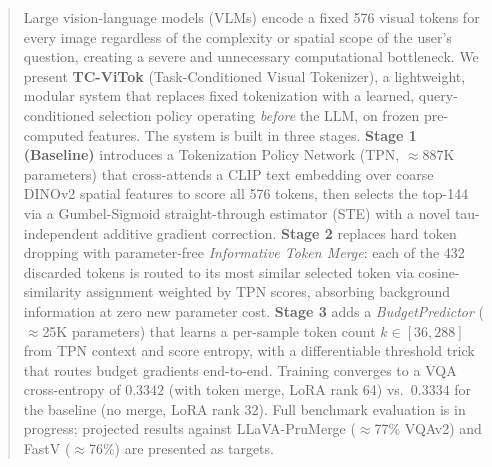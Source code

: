 \documentclass{article}
\begin{document}

\begin{abstract}
Large vision-language models (VLMs) encode a fixed 576 visual tokens for every image
regardless of the complexity or spatial scope of the user's question, creating a severe
and unnecessary computational bottleneck.
We present \textbf{TC-ViTok} (Task-Conditioned Visual Tokenizer), a lightweight,
modular system that replaces fixed tokenization with a learned, query-conditioned
selection policy operating \emph{before} the LLM, on frozen pre-computed features.
The system is built in three stages.
\textbf{Stage 1 (Baseline)} introduces a Tokenization Policy Network (TPN, $\approx$887K
parameters) that cross-attends a CLIP text embedding over coarse DINOv2 spatial features
to score all 576 tokens, then selects the top-144 via a Gumbel-Sigmoid
straight-through estimator (STE) with a novel tau-independent additive gradient correction.
\textbf{Stage 2} replaces hard token dropping with parameter-free
\emph{Informative Token Merge}: each of the 432 discarded tokens is routed to its
most similar selected token via cosine-similarity assignment weighted by TPN scores,
absorbing background information at zero new parameter cost.
\textbf{Stage 3} adds a \emph{BudgetPredictor} ($\approx$25K parameters) that
learns a per-sample token count $k \in [36, 288]$ from TPN context and score entropy,
with a differentiable threshold trick that routes budget gradients end-to-end.
Training converges to a VQA cross-entropy of $0.3342$ (with token merge, LoRA rank 64)
vs.\ $0.3334$ for the baseline (no merge, LoRA rank 32).
Full benchmark evaluation is in progress; projected results against LLaVA-PruMerge
($\approx$77\% VQAv2) and FastV ($\approx$76\%) are presented as targets.
\end{abstract}
\end{document}
